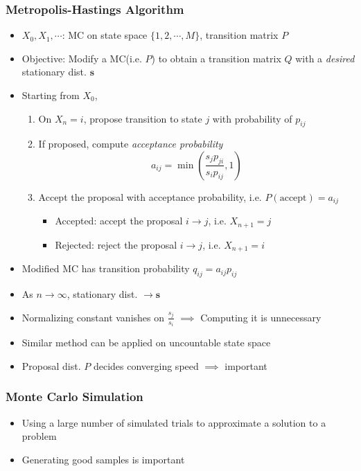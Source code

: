\subsubsection*{Metropolis-Hastings Algorithm}
\begin{itemize}
    \item $X_0,X_1,\cdots$: MC on state space $\{1,2,\cdots,M\}$, transition matrix $P$
    \item Objective: Modify a MC(i.e. $P$) to obtain a transition matrix $Q$ with a \textit{desired} stationary dist. $\mathbf{s}$
    \item Starting from $X_0$,
    \begin{enumerate}
        \item On $X_n=i$, propose transition to state $j$ with probability of $p_{ij}$
        \item If proposed, compute \textit{acceptance probability}
        \begin{equation}
            a_{ij}=\min\left(\frac{s_jp_{ji}}{s_ip_{ij}},1\right)
        \end{equation}
        \item Accept the proposal with acceptance probability, i.e. $P(\text{accept})=a_{ij}$
        \begin{itemize}
            \item Accepted: accept the proposal $i\to j$, i.e. $X_{n+1}=j$
            \item Rejected: reject the proposal $i\to j$, i.e. $X_{n+1}=i$
        \end{itemize}
    \end{enumerate}
    \item Modified MC has transition probability $q_{ij}=a_{ij}p_{ij}$
    \item As $n\to\infty$, stationary dist. $\to\mathbf{s}$
    \item Normalizing constant vanishes on $\frac{s_j}{s_i}$ $\implies$ Computing it is unnecessary
    \item Similar method can be applied on uncountable state space
    \item Proposal dist. $P$ decides converging speed $\implies$ important
\end{itemize}

\subsubsection*{Monte Carlo Simulation}
\begin{itemize}
    \item Using a large number of simulated trials to approximate a solution to a problem
    \item Generating good samples is important
\end{itemize}

